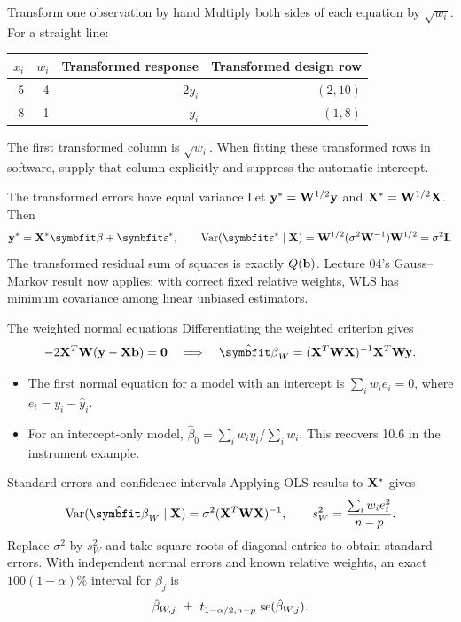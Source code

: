 \begin{frame}{Transform one observation by hand}
    Multiply both sides of each equation by $\sqrt{w_i}$. For a straight line:
    \begin{center}
        \begin{tabular}{rrrr}
            \toprule $x_i$ & $w_i$ & Transformed response & Transformed design row \\ \midrule
            5 & 4 & $2y_i$ & $(2,10)$ \\
            8 & 1 & $y_i$ & $(1,8)$ \\ \bottomrule
        \end{tabular}
    \end{center}
    The first transformed column is $\sqrt{w_i}$. When fitting these transformed rows in software, supply that column explicitly and suppress the automatic intercept.
\end{frame}

\begin{frame}{The transformed errors have equal variance}
    Let $\mathbf{y}^*=\mathbf{W}^{1/2}\mathbf{y}$ and $\mathbf{X}^*=\mathbf{W}^{1/2}\mathbf{X}$. Then
    \[
        \by^*=\bX^*\bbeta+\bvarepsilon^*,\qquad
        \Var(\bvarepsilon^*\mid\bX)
        =\bW^{1/2}(\sigma^2\bW^{-1})\bW^{1/2}=\sigma^2\bI.
    \]
    The transformed residual sum of squares is exactly $Q(\mathbf{b})$. Lecture 04's Gauss--Markov result now applies: with correct fixed relative weights, WLS has minimum covariance among linear unbiased estimators.
\end{frame}

\begin{frame}{The weighted normal equations}
    Differentiating the weighted criterion gives
    \[
        -2\bX^T\bW(\by-\bX\bb)=\bzero
        \quad\Longrightarrow\quad
        \hat{\bbeta}_{W}=(\bX^T\bW\bX)^{-1}\bX^T\bW\by.
    \]
    \begin{itemize}
        \item The first normal equation for a model with an intercept is $\sum_i w_i e_i=0$, where $e_i=y_i-\hat y_i$.
        \item For an intercept-only model, $\hat\beta_0=\sum_i w_i y_i/\sum_i w_i$. This recovers 10.6 in the instrument example.
    \end{itemize}
\end{frame}

\begin{frame}{Standard errors and confidence intervals}
    Applying OLS results to $\mathbf{X}^*$ gives
    \[
        \Var(\hat{\bbeta}_W\mid\bX)=\sigma^2(\bX^T\bW\bX)^{-1},
        \qquad s_W^2=\frac{\sum_i w_i e_i^2}{n-p}.
    \]
    Replace $\sigma^2$ by $s_W^2$ and take square roots of diagonal entries to obtain standard errors. With independent normal errors and known relative weights, an exact $100(1-\alpha)\%$ interval for $\beta_j$ is
    \[
        \hat\beta_{W,j}\ \pm\ t_{1-\alpha/2,n-p}\,\se(\hat\beta_{W,j}).
    \]
\end{frame}

